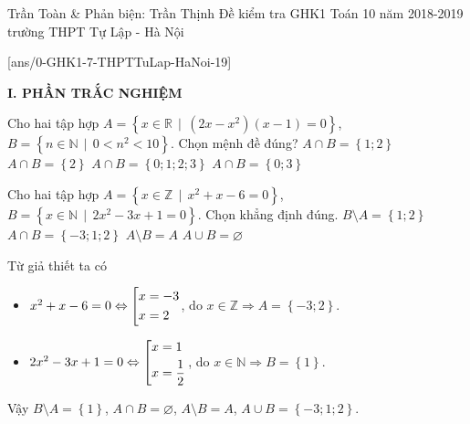 \begin{name}
{Trần Toàn \& Phản biện: Trần Thịnh }
{Đề kiểm tra GHK1 Toán 10 năm 2018-2019 trường THPT Tự Lập - Hà Nội}
\end{name}

\setcounter{ex}{0}\setcounter{bt}{0}
[ans/0-GHK1-7-THPTTuLap-HaNoi-19]

\noindent\textbf{I. PHẦN TRẮC NGHIỆM}

\begin{ex}%
Cho hai tập hợp $ A=\left\lbrace x\in \mathbb{R}\,\mid\,(2x-x^2)(x-1)=0 \right\rbrace$, $ B=\left\lbrace n \in \mathbb{N}\,\mid\,0<n^2<10 \right\rbrace$. Chọn mệnh đề đúng?
	\choice
	{\True $A \cap B =\left\lbrace 1;2 \right\rbrace $}
	{$A \cap B =\left\lbrace 2 \right\rbrace $}
	{ $A \cap B =\left\lbrace 0;1;2;3 \right\rbrace $}
	{$A \cap B =\left\lbrace 0;3 \right\rbrace $}
\end{ex}
\begin{ex}%
Cho hai tập hợp $ A=\left\lbrace x\in \mathbb{Z}\,\mid\, x^2+x-6=0 \right\rbrace$, $ B=\left\lbrace x\in \mathbb{N}\,\mid\, 2x^2-3x+1=0 \right\rbrace  $. Chọn khẳng định đúng.	
	\choice
	{$ B\setminus A=\left\lbrace 1;2 \right\rbrace  $}
	{$ A \cap B=\left\lbrace -3;1;2 \right\rbrace  $}
	{\True $ A\setminus B=A $}
	{$ A \cup B=\varnothing$}
	\loigiai
	{
Từ giả thiết ta có 
\begin{itemize}
	\item $ x^2+x-6=0\Leftrightarrow \left[\begin{aligned}& x=-3 \\ &x=2 \end{aligned}\right.$, do $ x \in \mathbb{Z} \Rightarrow A=\left\lbrace -3;2 \right\rbrace $.
	\item  $ 2x^2-3x+1=0\Leftrightarrow \left[\begin{aligned}& x=1 \\ &x=\dfrac{1}{2}\end{aligned}\right.$, do $ x\in \mathbb{N} \Rightarrow B= \left\lbrace 1 \right\rbrace$.
\end{itemize}
Vậy $ B\setminus A=\left\lbrace 1 \right\rbrace  $, $ A\cap B=\varnothing $, $ A\setminus B=A $, $ A \cup B= \left\lbrace -3;1;2 \right\rbrace  $.	 
	}
\end{ex}
